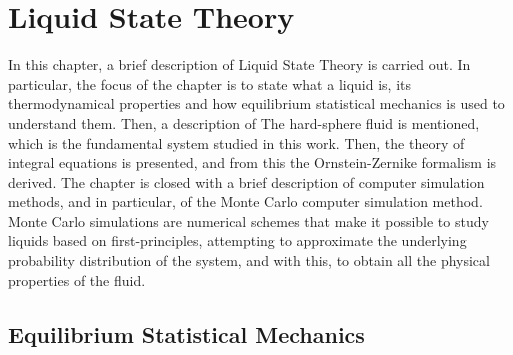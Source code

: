 \chapter{Liquid State Theory}
\label{Cap2}

In this chapter, a brief description of Liquid State Theory is carried out. In particular, 
the focus of the chapter is to state what a liquid is, its thermodynamical properties and
how equilibrium statistical mechanics is used to understand them. Then, a description of 
The hard-sphere fluid is mentioned, which is the fundamental system studied in this work.
Then, the theory of integral equations is presented, and from this the Ornstein-Zernike 
formalism is derived. The chapter is closed with a brief description of computer simulation
methods, and in particular, of the Monte Carlo computer simulation method. Monte Carlo 
simulations are numerical schemes that make it possible to study liquids based on 
first-principles, attempting to approximate the underlying probability distribution of
the system, and with this, to obtain all the physical properties of the fluid.

\section{Equilibrium Statistical Mechanics}
\label{sec:eq-statmech}

